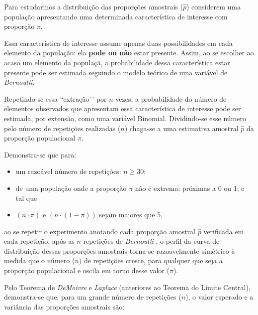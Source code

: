 \documentclass[
]{book}
\providecommand{\tightlist}{%
  \setlength{\itemsep}{0pt}\setlength{\parskip}{0pt}}
\begin{document}
\hfill\break

Para estudarmos a distribuição das proporções amostrais (\(\hat{p}\)) considerem uma população apresentando uma determinada característica de interesse com proporção \(\pi\).

\hfill\break

Essa característica de interesse assume apenas duas possibilidades em cada elemento da população: ela \textbf{pode ou não} estar presente. Assim, ao se escolher ao acaso um elemento da populaçã, a probabilidade dessa característica estar presente pode ser estimada seguindo o modelo teórico de uma variável de \emph{Bernoulli}.

\hfill\break

Repetindo-se essa ``extração'\,' por \(n\) vezes, a probabilidade do número de elementos observados que apresentam essa característica de interesse pode ser estimada, por extensão, como uma variável Binomial. Dividindo-se esse número pelo número de repetições realizadas (\(n\)) chaga-se a uma estimativa amostral \(\hat{p}\) da proporção populacional \(\pi\).

\hfill\break

Demonstra-se que para:

\hfill\break

\begin{itemize}
\tightlist
\item
  um razoável número de repetições: \(n \ge 30\);\\
\item
  de uma população onde a proporção \(\pi\) não é extrema: próximas a 0 ou 1; e tal que
\item
  \((n \cdot \pi)\) e \((n \cdot (1-\pi))\) sejam maiores que 5,
\end{itemize}

\hfill\break

ao se repetir o experimento anotando cada proporção amostral \(\hat{p}\) verificada em cada repetição, após as \(n\) repetições de \emph{Bernoulli} , o perfil da curva de distribuição dessas proporções amostrais torna-se razoavelmente simétrico à medida que o número (\(n\)) de repetições cresce, para qualquer que seja a proporção populacional e oscila em torno desse valor (\(\pi\)).

\hfill\break

Pelo Teorema de \emph{DeMoivre} e \emph{Laplace} (anteriores ao Teorema do Limite Central), demonstra-se que, para um grande número de repetições (\(n\)), o valor esperado e a variância das proporções amostrais são:
\end{document}
